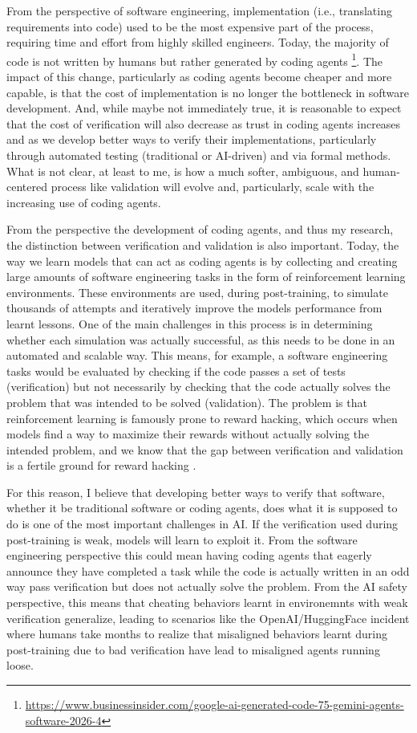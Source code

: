 \documentclass[11pt,a4paper]{article}
\begin{document}
From the perspective of software engineering, implementation (i.e., translating requirements into code) used to be the most expensive part of the process, requiring time and effort from highly skilled engineers.
Today, the majority of code is not written by humans but rather generated by coding agents \footnote{\url{https://www.businessinsider.com/google-ai-generated-code-75-gemini-agents-software-2026-4}}.
The impact of this change, particularly as coding agents become cheaper and more capable, is that the cost of implementation is no longer the bottleneck in software development.
And, while maybe not immediately true, it is reasonable to expect that the cost of verification will also decrease as trust in coding agents increases and as we develop better ways to verify their implementations, particularly through automated testing (traditional or AI-driven) and via formal methods.
What is not clear, at least to me, is how a much softer, ambiguous, and human-centered process like validation will evolve and, particularly, scale with the increasing use of coding agents.

From the perspective the development of coding agents, and thus my research, the distinction between verification and validation is also important.
Today, the way we learn models that can act as coding agents is by collecting and creating large amounts of software engineering tasks in the form of reinforcement learning environments.
These environments are used, during post-training, to simulate thousands of attempts and iteratively improve the models performance from learnt lessons.
One of the main challenges in this process is in determining whether each simulation was actually successful, as this needs to be done in an automated and scalable way.
This means, for example, a software engineering tasks would be evaluated by checking if the code passes a set of tests (verification) but not necessarily by checking that the code actually solves the problem that was intended to be solved (validation).
The problem is that reinforcement learning is famously prone to reward hacking, which occurs when models find a way to maximize their rewards without actually solving the intended problem, and we know that the gap between verification and validation is a fertile ground for reward hacking \cite{barr2014oracle, smith2015cure}.

For this reason, I believe that developing better ways to verify that software, whether it be traditional software or coding agents, does what it is supposed to do is one of the most important challenges in AI.
If the verification used during post-training is weak, models will learn to exploit it.
From the software engineering perspective this could mean having coding agents that eagerly announce they have completed a task while the code is actually written in an odd way pass verification but does not actually solve the problem.
From the AI safety perspective, this means that cheating behaviors learnt in environemnts with weak verification generalize, leading to scenarios like the OpenAI/HuggingFace incident \cite{metr-2026-openai-hugging-face-incident-investigation} where humans take months to realize that misaligned behaviors learnt during post-training due to bad verification have lead to misaligned agents running loose.
\end{document}

